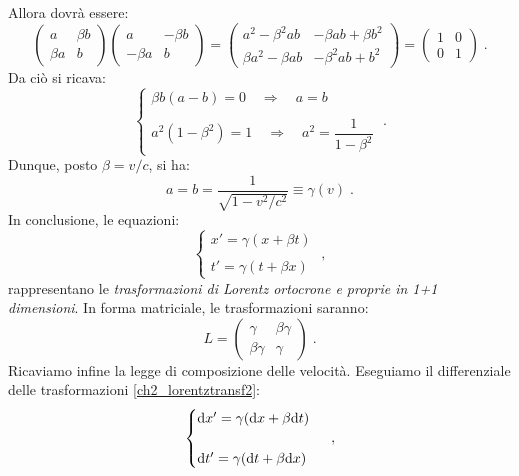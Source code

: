Allora dovrà essere:
\begin{equation}
\begin{pmatrix}
a & \beta b \\
\beta a & b
\end{pmatrix}\begin{pmatrix}
a & -\beta b \\
-\beta a & b
\end{pmatrix}=\begin{pmatrix}
a^2-\beta^2ab & -\beta ab+\beta b^2 \\
\beta a^2-\beta ab & -\beta^2ab+b^2
\end{pmatrix}=\begin{pmatrix}
1 & 0 \\
0 & 1
\end{pmatrix}\;.
\end{equation}
Da ciò si ricava:
\begin{equation}
\begin{cases}
\beta b(a-b) =0\quad \Longrightarrow\quad a=b \\
\\
a^2(1-\beta^2)=1\quad \Longrightarrow\quad a^2=\dfrac{1}{1-\beta^2}
\end{cases}\;.
\end{equation}
Dunque, posto $\beta=v/c$, si ha:
\begin{equation}
a=b=\frac{1}{\sqrt{1-v^2/c^2}}\equiv \gamma(v)\;.
\end{equation}
In conclusione, le equazioni:
\begin{equation}
\begin{cases}
 x'=\gamma(x+\beta t) \\
\\
t'=\gamma(t+\beta x)
\end{cases}\;, \label{ch2_lorentztransf2}
\end{equation}
rappresentano le \textit{trasformazioni di Lorentz ortocrone e proprie in 1+1 dimensioni}. In forma matriciale, le trasformazioni 
saranno:
\begin{equation}
L= \begin{pmatrix}
\gamma & \beta\gamma \\
\beta\gamma & \gamma
\end{pmatrix}\;.
\end{equation}
Ricaviamo infine la legge di composizione delle velocità. Eseguiamo il differenziale delle trasformazioni \eqref{ch2_lorentztransf2}:
\begin{equation}
\begin{cases}
\mathrm{d}{x'}=\gamma(\mathrm{d}{x}+\beta\mathrm{d}{t}) \\
\\
\mathrm{d}{t'}=\gamma(\mathrm{d}{t}+\beta\mathrm{d}{x})
\end{cases}\;,
\end{equation}
